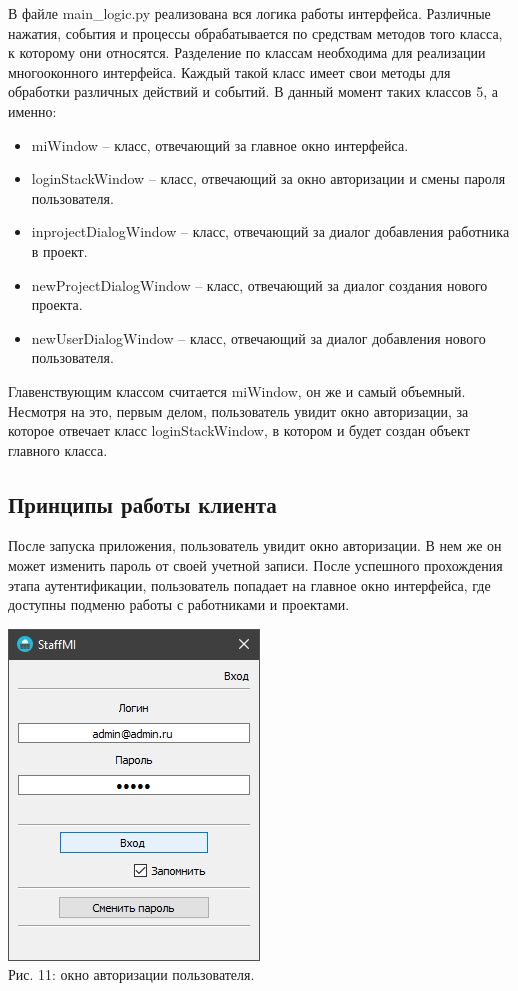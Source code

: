 \documentclass[14pt,a4paper,openbib]{extarticle}
\numberwithin{equation}{section}
\begin{document}
В файле main\_logic.py реализована вся логика работы интерфейса. Различные нажатия, события и процессы обрабатывается по средствам методов того класса, к которому они относятся. Разделение по классам необходима для реализации многооконного интерфейса. Каждый такой класс имеет свои методы для обработки различных действий и событий. В данный момент таких классов 5, а именно:
\begin{itemize}
  \item miWindow – класс, отвечающий за главное окно интерфейса.
  \item loginStackWindow – класс, отвечающий за окно авторизации и смены пароля пользователя.
  \item inprojectDialogWindow – класс, отвечающий за диалог добавления работника в проект.
  \item newProjectDialogWindow – класс, отвечающий за диалог создания нового проекта.
  \item newUserDialogWindow – класс, отвечающий за диалог добавления нового пользователя.
\end{itemize}

Главенствующим классом считается miWindow, он же и самый объемный. Несмотря на это, первым делом, пользователь увидит окно авторизации, за которое отвечает класс loginStackWindow, в котором и будет создан объект главного класса.


\newpage
\subsection{Принципы работы клиента}
После запуска приложения, пользователь увидит окно авторизации. В нем же он может изменить пароль от своей учетной записи. После успешного прохождения этапа аутентификации, пользователь попадает на главное окно интерфейса, где доступны подменю работы с работниками и проектами.
\begin{center}
\includegraphics[scale=0.7]{img/auth_window_win.png}\\
Рис. 11: окно авторизации пользователя.\\[\baselineskip]
\end{center}
\end{document}
